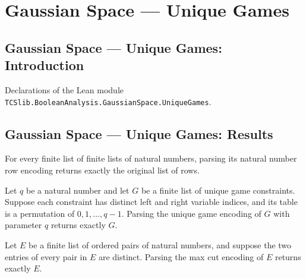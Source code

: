 \section{Gaussian Space --- Unique Games}
\subsection*{Gaussian Space --- Unique Games: Introduction}

Declarations of the Lean module \texttt{TCSlib.BooleanAnalysis.GaussianSpace.UniqueGames}.

\subsection*{Gaussian Space --- Unique Games: Results}

\begin{theorem}
\label{BooleanAnalysis.GaussianSpace.UniqueGames.parseNatRows_encodeNatRows}
\leanok
{}
For every finite list of finite lists of natural numbers, parsing its natural number row
encoding returns exactly the original list of rows.
\end{theorem}

\begin{theorem}
\label{BooleanAnalysis.GaussianSpace.UniqueGames.parseUniqueGame_encodeUniqueGame}
\leanok
{}
Let $q$ be a natural number and let $G$ be a finite list of unique game constraints.
Suppose each constraint has distinct left and right variable indices, and its table is a
permutation of $0,1,\ldots,q-1$. Parsing the unique game encoding of $G$ with parameter
$q$ returns exactly $G$.
\end{theorem}

\begin{theorem}
\label{BooleanAnalysis.GaussianSpace.UniqueGames.parseMaxCut_encodeMaxCut}
\leanok
{}
Let $E$ be a finite list of ordered pairs of natural numbers, and suppose the two
entries of every pair in $E$ are distinct. Parsing the max cut encoding of $E$ returns
exactly $E$.
\end{theorem}

